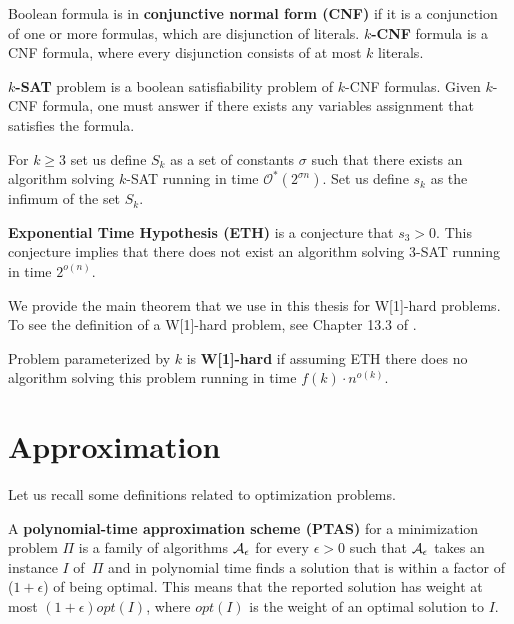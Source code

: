 \begin{defi}
\label{definition:cnf}
Boolean formula is in \textbf{conjunctive normal form (CNF)} if
it is a conjunction of one or more formulas,
which are disjunction of literals.
\textbf{$k$-CNF} formula is a CNF formula, where
every disjunction consists of at most $k$ literals.
\end{defi}

\begin{defi}
\textbf{$k$-SAT} problem is 
a boolean satisfiability problem of $k$-CNF formulas.
Given $k$-CNF formula, one must answer if there
exists any variables assignment that satisfies the formula.
\end{defi}

\begin{defi}
For $k \ge 3$ set us define $S_k$ as a set of constants $\sigma$
such that there exists an algorithm solving $k$-SAT running in time
$\mathcal{O}^{*}(2^{\sigma n})$.
Set us define $s_k$ as the infimum  of the set $S_k$.

\textbf{Exponential Time Hypothesis (ETH)} is a conjecture
that $s_3 > 0$. This conjecture implies that
there does not exist an algorithm solving 3-SAT
running in time $2^{o(n)}$.
\end{defi}

We provide the main theorem that we use in this thesis for W[1]-hard
problems. To see the definition of a W[1]-hard problem,
see Chapter 13.3 of \cite{platypus_book}.

\begin{tw}
Problem parameterized by $k$ is \textbf{W[1]-hard} if assuming ETH there
does no algorithm solving this problem running in time
$f(k)\cdot n^{o(k)}$.
\end{tw}

\section{Approximation}

Let us recall some definitions related to optimization problems.

\begin{defi}
A \textbf{polynomial-time approximation scheme (PTAS)}
for a minimization problem $\Pi$
is a family of algorithms $\cal{A}_\epsilon$ for
every $\epsilon > 0$
such that $\cal{A}_\epsilon$ takes an instance $I$ of~$\Pi$
and in polynomial time
finds a solution that is within a factor
of ($1+\epsilon$) of being optimal.
This means that the reported solution has weight at most
$(1+\epsilon)opt(I)$, where $opt(I)$ is the weight
of an optimal solution to $I$.
\end{defi}

